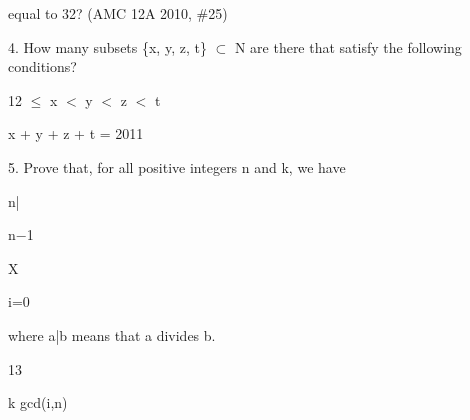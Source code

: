 \documentclass[a4paper,portrait,12pt]{article}
\begin{document}
\begin{flushleft}
equal to 32? (AMC 12A 2010, \#25)
\end{flushleft}


\begin{flushleft}
4. How many subsets \{x, y, z, t\} $\subset$ N are there that satisfy the following conditions?
\end{flushleft}





\begin{flushleft}
12 $\leq$ x $<$ y $<$ z $<$ t
\end{flushleft}


\begin{flushleft}
x + y + z + t = 2011
\end{flushleft}


\begin{flushleft}
5. Prove that, for all positive integers n and k, we have
\end{flushleft}


\begin{flushleft}
n|
\end{flushleft}





\begin{flushleft}
n$-$1
\end{flushleft}


\begin{flushleft}
X
\end{flushleft}


\begin{flushleft}
i=0
\end{flushleft}





\begin{flushleft}
where a|b means that a divides b.
\end{flushleft}





13





\begin{flushleft}
k gcd(i,n)
\end{flushleft}





\newpage
\end{document}
